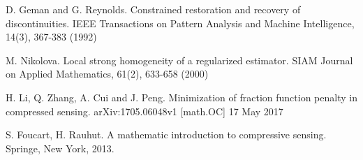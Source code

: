 \documentclass[smallextended]{svjour3}
\begin{document}
\begin{thebibliography}{}
D. Geman and G. Reynolds. Constrained restoration and recovery of discontinuities. IEEE Transactions on Pattern Analysis and Machine Intelligence, 14(3), 367-383 (1992)

M. Nikolova. Local strong homogeneity of a regularized estimator. SIAM Journal on Applied Mathematics, 61(2), 633-658 (2000)

H. Li, Q. Zhang, A. Cui and J. Peng. Minimization of fraction function penalty in compressed sensing. arXiv:1705.06048v1 [math.OC] 17 May 2017

S. Foucart, H. Rauhut. A mathematic introduction to compressive sensing. Springe, New York, 2013.

\end{thebibliography}
\end{document}
